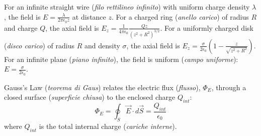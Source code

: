 For an infinite straight wire (\textit{filo rettilineo infinito}) with uniform charge density \(\lambda\), the field is \(E = \frac{\lambda}{2\pi\epsilon_0 z}\) at distance \(z\). For a charged ring (\textit{anello carico}) of radius \(R\) and charge \(Q\), the axial field is \(E_z = \frac{1}{4\pi\epsilon_0} \frac{Qz}{(z^2 + R^2)^{3/2}}\). For a uniformly charged disk (\textit{disco carico}) of radius \(R\) and density \(\sigma\), the axial field is \(E_z = \frac{\sigma}{2\epsilon_0} \left(1 - \frac{z}{\sqrt{z^2 + R^2}}\right)\). For an infinite plane (\textit{piano infinito}), the field is uniform (\textit{campo uniforme}): \(E = \frac{\sigma}{2\epsilon_0}\).

Gauss's Law (\textit{teorema di Gaus}) relates the electric flux (\textit{flusso}), \(\Phi_E\), through a closed surface (\textit{superficie chiusa}) to the enclosed charge \(Q_{int}\):
\begin{equation}
    \Phi_E = \oint_S \vec{E} \cdot d\vec{S} = \frac{Q_{int}}{\epsilon_0}
\end{equation}
where \(Q_{int}\) is the total internal charge (\textit{cariche interne}).
